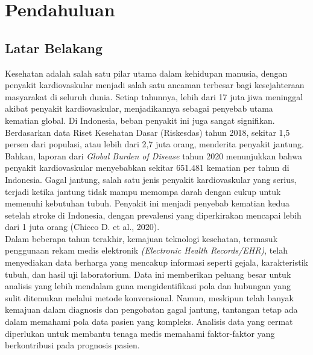 \documentclass[english,12pt,a4paper,openany]{book}
\begin{document}
	\chapter{Pendahuluan}
	\section{Latar Belakang}
	Kesehatan adalah salah satu pilar utama dalam kehidupan manusia, dengan penyakit kardiovaskular menjadi salah satu ancaman terbesar bagi kesejahteraan masyarakat di seluruh dunia. Setiap tahunnya, lebih dari 17 juta jiwa meninggal akibat penyakit kardiovaskular, menjadikannya sebagai penyebab utama kematian global. Di Indonesia, beban penyakit ini juga sangat signifikan. Berdasarkan data Riset Kesehatan Dasar (Riskesdas) tahun 2018, sekitar 1,5 persen dari populasi, atau lebih dari 2,7 juta orang, menderita penyakit jantung. Bahkan, laporan dari \textit{Global Burden of Disease} tahun 2020 menunjukkan bahwa penyakit kardiovaskular menyebabkan sekitar 651.481 kematian per tahun di Indonesia. Gagal jantung, salah satu jenis penyakit kardiovaskular yang serius, terjadi ketika jantung tidak mampu memompa darah dengan cukup untuk memenuhi kebutuhan tubuh. Penyakit ini menjadi penyebab kematian kedua setelah stroke di Indonesia, dengan prevalensi yang diperkirakan mencapai lebih dari 1 juta orang (Chicco D. et al., 2020).\\
	
	Dalam beberapa tahun terakhir, kemajuan teknologi kesehatan, termasuk penggunaan rekam medis elektronik \textit{(Electronic Health Records/EHR)}, telah menyediakan data berharga yang mencakup informasi seperti gejala, karakteristik tubuh, dan hasil uji laboratorium. Data ini memberikan peluang besar untuk analisis yang lebih mendalam guna mengidentifikasi pola dan hubungan yang sulit ditemukan melalui metode konvensional. Namun, meskipun telah banyak kemajuan dalam diagnosis dan pengobatan gagal jantung, tantangan tetap ada dalam memahami pola data pasien yang kompleks. Analisis data yang cermat diperlukan untuk membantu tenaga medis memahami faktor-faktor yang berkontribusi pada prognosis pasien.\\
	
\end{document}
